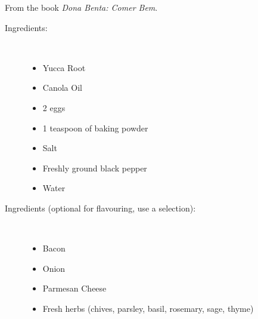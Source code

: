 \documentclass[11pt,letterpaper]{article}
\begin{document}


\begin{flushright}
From the book {\it Dona Benta: Comer Bem}.
\end{flushright}


\begin{description}

\item[Ingredients:]\ \\
	\begin{itemize}
	\item Yucca Root
	\item Canola Oil
	\item 2 eggs
	\item 1 teaspoon of baking powder
	\item Salt
	\item Freshly ground black pepper
	\item Water
	\end{itemize}

\item[Ingredients (optional for flavouring, use a selection):]\ \\
	\begin{itemize}
	\item Bacon	
	\item Onion
	\item Parmesan Cheese
	\item Fresh herbs (chives, parsley, basil, rosemary, sage, thyme)
	\end{itemize}


\end{description}
\end{document}
